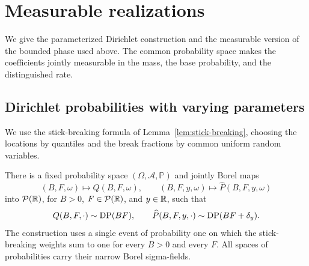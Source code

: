 \section{Measurable realizations}
\label{sec:measurable-realizations}

We give the parameterized Dirichlet construction and the measurable version of the bounded phase used above.
The common probability space makes the coefficients jointly measurable in the mass, the base probability, and the distinguished rate.

\subsection{Dirichlet probabilities with varying parameters}

We use the stick-breaking formula of Lemma~\ref{lem:stick-breaking}, choosing the locations by quantiles and the break fractions by common uniform random variables.

\begin{lemma}
\label{lem:parameterized-dirichlet}
There is a fixed probability space \((\Omega,\mathcal A,\mathbb P)\) and jointly Borel maps
\[
 (B,F,\omega)\longmapsto Q(B,F,\omega),\qquad
 (B,F,y,\omega)\longmapsto\widehat P(B,F,y,\omega)
\]
into \(\mathcal P(\mathbb R)\), for \(B>0\), \(F\in\mathcal P(\mathbb R)\), and \(y\in\mathbb R\), such that
\[
 Q(B,F,\cdot)\sim\operatorname{DP}(BF),\qquad
 \widehat P(B,F,y,\cdot)\sim\operatorname{DP}(BF+\delta_y).
\]
The construction uses a single event of probability one on which the stick-breaking weights sum to one for every \(B>0\) and every \(F\).
All spaces of probabilities carry their narrow Borel sigma-fields.
\end{lemma}

